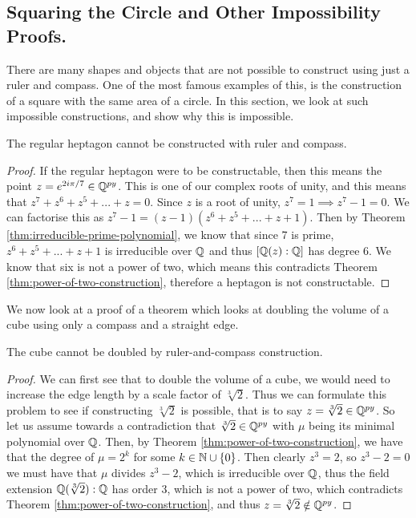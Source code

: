 \subsection{Squaring the Circle and Other Impossibility Proofs.}

There are many shapes and objects that are not possible to construct using just a ruler and compass. One of the most famous examples of this, is the construction of a square with the same area of a circle. In this section, we look at such impossible constructions, and show why this is impossible.

\begin{theorem}
    The regular heptagon cannot be constructed with ruler and compass.
\end{theorem}

\begin{proof}
    If the regular heptagon were to be constructable, then this means the point $z=e^{2i\pi/7} \in \mathbb Q^{py}$. This is one of our complex roots of unity, and this means that $z^7+z^6+z^5+...+z=0$. Since $z$ is a root of unity, $z^7=1 \implies z^7 - 1 = 0$. We can factorise this as $z^7-1=(z-1)(z^6+z^5+...+z+1)$. Then by Theorem \ref{thm:irreducible-prime-polynomial}, we know that since 7 is prime, $z^6+z^5+...+z+1$ is irreducible over $\mathbb Q$ and thus $[\mathbb Q(z):\mathbb Q]$ has degree 6. We know that six is not a power of two, which means this contradicts Theorem \ref{thm:power-of-two-construction}, therefore a heptagon is not constructable.
\end{proof}

We now look at a proof of a theorem which looks at doubling the volume of a cube using only a compass and a straight edge.

\begin{theorem}
    The cube cannot be doubled by ruler-and-compass construction.
\end{theorem}

\begin{proof}  
    We can first see that to double the volume of a cube, we would need to increase the edge length by a scale factor of $\sqrt[3]{2}$. Thus we can formulate this problem to see if constructing $\sqrt[3]{2}$ is possible, that is to say $z = \sqrt[3]{2} \in \mathbb Q^{py}$.
\noindent
\newline
    So let us assume towards a contradiction that $\sqrt[3]{2} \in \mathbb Q^{py}$ with $\mu$ being its minimal polynomial over $\mathbb Q$. Then, by Theorem \ref{thm:power-of-two-construction}, we have that the degree of $\mu = 2^k$ for some $k\in \mathbb N \cup \{0\}$.
\noindent
\newline
    Then clearly $z^3=2$, so $z^3-2=0$ we must have that $\mu$ divides $z^3-2$, which is irreducible over $\mathbb Q$, thus the field extension $\mathbb Q(\sqrt[3]{2}):\mathbb Q$ has order 3, which is not a power of two, which contradicts Theorem \ref{thm:power-of-two-construction}, and thus $z = \sqrt[3]{2} \notin \mathbb Q^{py}$.

\end{proof}


